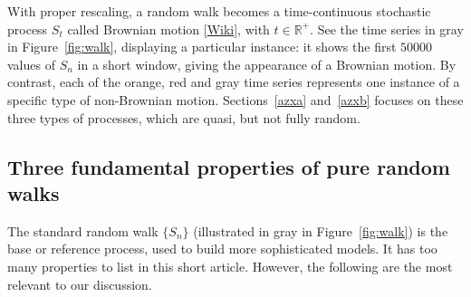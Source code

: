 \documentclass[oneside,10pt]{book}
\begin{document}
With proper rescaling, a random walk becomes a time-continuous stochastic process $S_t$ called \textcolor{index}{Brownian motion} [\href{https://en.wikipedia.org/wiki/Brownian_motion}{Wiki}], with $t\in\mathbb{R}^+$. See the time series in gray in Figure~\ref{fig:walk}, displaying a particular instance: it shows the first $\num{50000}$ values of
 $S_n$ in a short window, giving the appearance of a Brownian motion. 
By contrast, each of the orange, red and gray time series represents one instance of a specific type of non-Brownian motion. Sections~\ref{azxa} and~\ref{azxb} focuses on these three types of processes,  which are quasi, but not fully random.





\subsection{Three fundamental properties of pure random walks}\label{poyt}

The standard random walk $\{S_n\}$ (illustrated in gray in Figure~\ref{fig:walk}) is the base or reference process, used to build more sophisticated models. It has too many properties to list in this short article. However, the following are the most relevant to our discussion.
\end{document}

